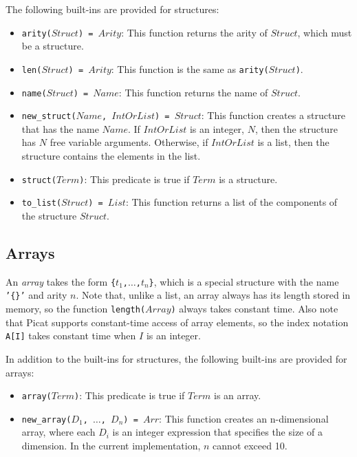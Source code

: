 The following built-ins are provided for structures:
\begin{itemize}
\item \texttt{arity($Struct$) = $Arity$}: This function returns the arity of $Struct$, which must be a structure.
\item \texttt{len($Struct$) = $Arity$}: This function is the same as \texttt{arity($Struct$)}.
\item \texttt{name($Struct$) = $Name$}: This function returns the name of $Struct$.
\item \texttt{new\_struct($Name$, $IntOrList$) = $Struct$}: This function creates a structure that has the name $Name$.  If $IntOrList$ is an integer, $N$, then the structure has $N$ free variable arguments.  Otherwise, if $IntOrList$ is a list, then the structure contains the elements in the list.  
\item \texttt{struct($Term$)}: This predicate is true if $Term$ is a structure.
\item \texttt{to\_list($Struct$) = $List$}: This function returns a list of the components of the structure $Struct$.
\end{itemize}

\subsection{\label{subsec:arrays}Arrays}
An \emph{array} takes the form \texttt{\{$t_1$,$\ldots$,$t_{n}$\}}, which is a special structure with the name \texttt{'\{\}'} and arity $n$. Note that, unlike a list, an array always has its length stored in memory, so the function \texttt{length($Array$)} always takes constant time. Also note that Picat supports constant-time access of array elements, so the index notation \texttt{A[I]} takes constant time when $I$ is an integer. 

In addition to the built-ins for structures, the following built-ins are provided for arrays:
\begin{itemize}
\item \texttt{array($Term$)}: This predicate is true if $Term$ is an array.
\item \texttt{new\_array($D_1$, $\ldots$, $D_n$) = $Arr$}: This function creates an n-dimensional array, where each $D_i$ is an integer expression that specifies the size of a dimension. In the current implementation, $n$ cannot exceed 10.
\end{itemize}

